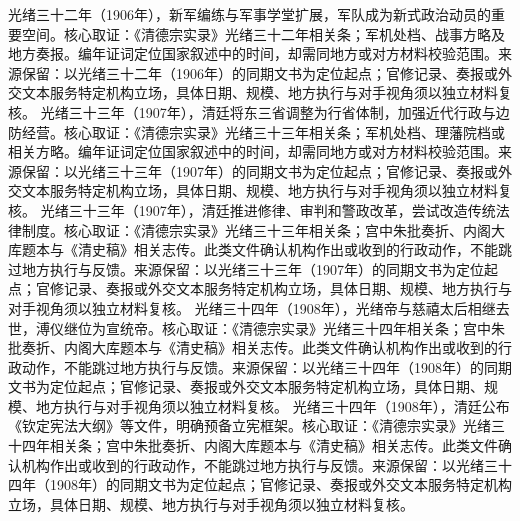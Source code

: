 光绪三十二年（1906年），新军编练与军事学堂扩展，军队成为新式政治动员的重要空间。核心取证：《清德宗实录》光绪三十二年相关条；军机处档、战事方略及地方奏报。编年证词定位国家叙述中的时间，却需同地方或对方材料校验范围。来源保留：以光绪三十二年（1906年）的同期文书为定位起点；官修记录、奏报或外交文本服务特定机构立场，具体日期、规模、地方执行与对手视角须以独立材料复核。
光绪三十三年（1907年），清廷将东三省调整为行省体制，加强近代行政与边防经营。核心取证：《清德宗实录》光绪三十三年相关条；军机处档、理藩院档或相关方略。编年证词定位国家叙述中的时间，却需同地方或对方材料校验范围。来源保留：以光绪三十三年（1907年）的同期文书为定位起点；官修记录、奏报或外交文本服务特定机构立场，具体日期、规模、地方执行与对手视角须以独立材料复核。
光绪三十三年（1907年），清廷推进修律、审判和警政改革，尝试改造传统法律制度。核心取证：《清德宗实录》光绪三十三年相关条；宫中朱批奏折、内阁大库题本与《清史稿》相关志传。此类文件确认机构作出或收到的行政动作，不能跳过地方执行与反馈。来源保留：以光绪三十三年（1907年）的同期文书为定位起点；官修记录、奏报或外交文本服务特定机构立场，具体日期、规模、地方执行与对手视角须以独立材料复核。
光绪三十四年（1908年），光绪帝与慈禧太后相继去世，溥仪继位为宣统帝。核心取证：《清德宗实录》光绪三十四年相关条；宫中朱批奏折、内阁大库题本与《清史稿》相关志传。此类文件确认机构作出或收到的行政动作，不能跳过地方执行与反馈。来源保留：以光绪三十四年（1908年）的同期文书为定位起点；官修记录、奏报或外交文本服务特定机构立场，具体日期、规模、地方执行与对手视角须以独立材料复核。
光绪三十四年（1908年），清廷公布《钦定宪法大纲》等文件，明确预备立宪框架。核心取证：《清德宗实录》光绪三十四年相关条；宫中朱批奏折、内阁大库题本与《清史稿》相关志传。此类文件确认机构作出或收到的行政动作，不能跳过地方执行与反馈。来源保留：以光绪三十四年（1908年）的同期文书为定位起点；官修记录、奏报或外交文本服务特定机构立场，具体日期、规模、地方执行与对手视角须以独立材料复核。
